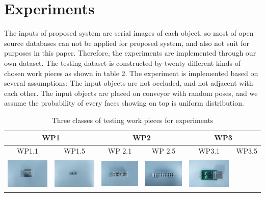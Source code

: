 \documentclass[journal]{IEEEtran}
\begin{document}
\section{Experiments}
The inputs of proposed system are serial images of each object, so most of open source databases can not be applied for proposed system, and also not suit for purposes in this paper. Therefore, the experiments are implemented through our own dataset. The testing dataset is constructed by twenty different kinds of chosen work pieces as shown in table 2.
The experiment is implemented based on several assumptions: The input objects are not occluded, and not adjacent with each other. The input objects are placed on conveyor with random poses, and we assume the probability of every faces showing on top is uniform distribution. 


\begin{table}[!t]
\caption{Three classes of testing work pieces for experiments}
\begin{center}
\begin{tabular}{|c|c||c|c||c|c|}
\hline
\multicolumn{2}{|c||}{\bf{WP1}} & \multicolumn{2}{c||}{\bf{WP2}} & \multicolumn{2}{c|}{\bf{WP3}}\\
\hline\hline
WP1.1 & WP1.5 & WP 2.1 & WP 2.5 & WP3.1 & WP3.5\\
\hline
\includegraphics[width=1in,height=0.6in]{j_img/wp11.jpg} & 
\includegraphics[width=1in,height=0.6in]{j_img/wp15.jpg} & 
\includegraphics[width=1in,height=0.6in]{j_img/wp21.jpg} & 
\includegraphics[width=1in,height=0.6in]{j_img/wp25.jpg} &
\includegraphics[width=1in,height=0.6in]{j_img/wp31.jpg} & 

\end{tabular}
\end{center}
\end{table}
\end{document}
